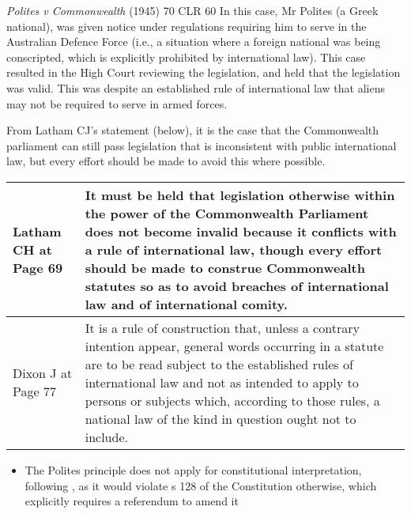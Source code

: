 \begin{casedetails}{\textit{Polites v Commonwealth} (1945) 70 CLR 60}\label{case:Polites v Commonwealth}
    \flushleft
    In this case, Mr Polites (a Greek national), was given notice under regulations requiring him to serve in the Australian Defence Force (i.e., a situation where a foreign national was being conscripted, which is explicitly prohibited by international law). This case resulted in the High Court reviewing the legislation, and held that the legislation was valid. This was despite an established rule of international law that aliens may not be required to serve in armed forces.

    \vspace{\baselineskip}

    From Latham CJ's statement (below), it is the case that the Commonwealth parliament can still pass legislation that is inconsistent with public international law, but every effort should be made to avoid this where possible.

    \begin{longtable}{p{}|>{\raggedright\arraybackslash}p{}}
        Latham CH at Page 69 & It must be held that legislation otherwise within the power of the Commonwealth Parliament does not become invalid because it conflicts with a rule of international law, though every effort should be made to construe Commonwealth statutes so as to avoid breaches of international law and of international comity. \\\hline
        Dixon J at Page 77 & It is a rule of construction that, unless a contrary intention appear, general words occurring in a statute are to be read subject to the established rules of international law and not as intended to apply to persons or subjects which, according to those rules, a national law of the kind in question ought not to include.
    \end{longtable}  
\end{casedetails}

\begin{itemize}
    \item The Polites principle does not apply for constitutional interpretation, following , as it would violate s 128 of the Constitution otherwise, which explicitly requires a referendum to amend it
\end{itemize}

